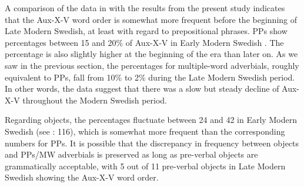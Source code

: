 \documentclass[output=paper, colorlinks, citecolor=brown]{langscibook}
\begin{document}
A comparison of the data in \citet{Sangfelt2019} with the results from the present study indicates that the Aux-X-V word order is somewhat more frequent before the beginning of Late Modern Swedish, at least with regard to prepositional phrases. PPs show percentages between 15 and 20\% of Aux-X-V in Early Modern Swedish \citep[119]{Sangfelt2019}. The percentage is also slightly higher at the beginning of the era than later on. As we saw in the previous section, the percentages for multiple-word adverbials, roughly equivalent to PPs, fall from 10\% to 2\% during the Late Modern Swedish period. In other words, the data suggest that there was a slow but steady decline of Aux-X-V throughout the Modern Swedish period.



Regarding objects, the percentages fluctuate between 24 and 42 in Early Modern Swedish (see \citealt{Sangfelt2019}: 116), which is somewhat more frequent than the corresponding numbers for PPs. It is possible that the discrepancy in frequency between objects and PPs/MW adverbials is preserved as long as pre-verbal objects are grammatically acceptable, with 5 out of 11 pre-verbal objects in Late Modern Swedish showing the Aux-X-V word order.
\end{document}
